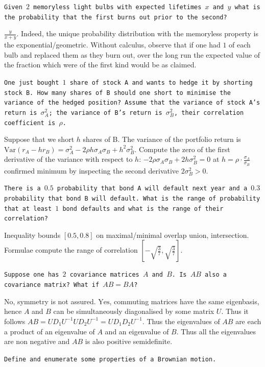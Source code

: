 \texttt{Given $2$ memoryless light bulbs with expected lifetimes $x$ and $y$ what is the probability that the first burns out prior to the second?}

$\boxed{\frac{y}{x+y}}$. Indeed, the unique probability distribution with the memoryless property is the exponential/geometric. Without calculus, observe that if one had $1$ of each bulb and replaced them as they burn out, over the long run the expected value of the fraction which were of the first kind would be as claimed.

\texttt{One just bought $1$ share of stock A and wants to hedge it by shorting stock B. How many shares of B should one short to minimise the variance of the hedged position? Assume that the variance of stock A's return is $\sigma_A^2$; the variance of B's return is $\sigma_B^2$, their correlation coefficient is $\rho$.}

Suppose that we short $h$ shares of B. The variance of the portfolio return is $\text{Var}(r_A - h r_B)=\sigma_A^2 - 2 \rho h \sigma_A \sigma_B + h^2 \sigma_B^2$. Compute the zero of the first derivative of the variance with respect to $h$: $-2 \rho \sigma_A \sigma_B + 2 h \sigma_B^2 = 0$ at $h = \boxed{\rho \cdot \frac{\sigma_A}{\sigma_B} }$ confirmed minimum by inspecting the second derivative $2 \sigma_B^2 > 0$.

\texttt{There is a $0.5$ probability that bond A will default next year and a $0.3$ probability that bond B will default. What is the range of probability that at least $1$ bond defaults and what is the range of their correlation?}

Inequality bounds $\boxed{[0.5,0.8]}$ on maximal/minimal overlap union, intersection. Formulae compute the range of correlation $\boxed{\left[-\sqrt{\frac{3}{7}},\sqrt{\frac{3}{7}}\right]}$.

\texttt{Suppose one has $2$ covariance matrices $A$ and $B$. Is $AB$ also a covariance matrix? What if $AB=BA$?}

$\boxed{\text{No}}$, symmetry is not assured. $\boxed{\text{Yes}}$, commuting matrices have the same eigenbasis, hence $A$ and $B$ can be simultaneously diagonalised by some matrix $U$. Thus it follows $AB=UD_1 U^{-1}UD_2 U^{-1}=U D_1 D_2 U^{-1}$. Thus the eigenvalues of $AB$ are each a product of an eigenvalue of $A$ and an eigenvalue of $B$. Thus all the eigenvalues are non negative and $AB$ is also positive semidefinite.

\texttt{Define and enumerate some properties of a Brownian motion.}

